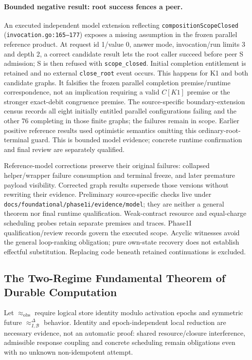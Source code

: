 \documentclass[11pt,a4paper]{article}
\theoremstyle{definition}
\theoremstyle{remark}
\begin{document}
\paragraph{Bounded negative result: root success fences a peer.} An executed independent model extension reflecting \texttt{compositionScopeClosed} (\texttt{invocation.go:165--177}) exposes a missing assumption in the frozen parallel reference product. At request id 1/value 0, answer mode, invocation/run limits 3 and depth 2, a correct candidate result lets the root caller succeed before peer S admission; S is then refused with \texttt{scope\_closed}. Initial completion entitlement is retained and no external \texttt{close\_root} event occurs. This happens for K1 and both candidate graphs. It falsifies the frozen parallel completion premise/runtime correspondence, not an implication requiring a valid $C[K1]$ premise or the stronger exact-debit congruence premise. The source-specific boundary-extension census records all eight initially entitled parallel configurations failing and the other 76 completing in those finite graphs; the failures remain in scope. Earlier positive reference results used optimistic semantics omitting this ordinary-root-terminal guard. This is bounded model evidence; concrete runtime confirmation and final review are separately qualified.

Reference-model corrections preserve their original failures: collapsed helper/wrapper failure consumption and terminal freeze, and later premature payload visibility. Corrected graph results supersede those versions without rewriting their evidence. Preliminary source-specific checks live under \texttt{docs/foundational/phase1i/evidence/model}; they are neither a general theorem nor final runtime qualification. Weak-contract resource and equal-charge scheduling probes retain separate premises and traces. Phase1I qualification/review records govern the executed scope. Acyclic witnesses avoid the general loop-ranking obligation; pure own-state recovery does not establish effectful substitution. Replacing code beneath retained continuations is excluded.


\subsection{The Two-Regime Fundamental Theorem of Durable Computation}
Let $\approx_{\mathrm{obs}}$ require logical store identity modulo activation epochs and symmetric future $\approx^{\Delta}_{I,\mathcal{B}}$ behavior. Identity and epoch-independent local reduction are necessary evidence, not an automatic proof: shared resource/closure interference, admissible response coupling and concrete scheduling remain obligations even with no unknown non-idempotent attempt.
\end{document}
